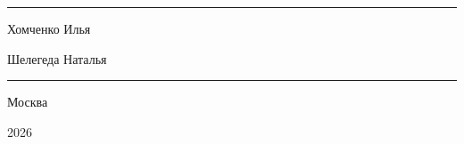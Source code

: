 \documentclass[12pt,a4paper,oneside]{book}
\begin{document}
\begin{titlepage}
\begin{center}
\vspace{0.35cm}

\rule{0.55\textwidth}{0.4pt}

\vspace{0.3cm}

{\Large Хомченко Илья\par}

\vspace{0.2cm}

{\Large Шелегеда Наталья\par}

\vspace{0.3cm}

\rule{0.55\textwidth}{0.4pt}

\vfill

{\large Москва\par}

\vspace{0.1cm}

{\large 2026\par}

\end{center}
\end{titlepage}


\frontmatter



\begingroup
  \small
  \setlength{\emergencystretch}{4em}%
  \sloppy
  \tableofcontents
\endgroup
\clearpage


\mainmatter











\end{document}
